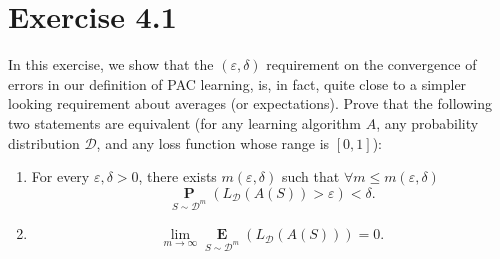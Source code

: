 \documentclass[10pt, a4paper, twoside]{amsart}
\renewcommand{\P}{\operatorname*{\ensuremath{\mathbf{P}}}} %
\newcommand{\Ev}{\operatorname*{\ensuremath{\mathbf{E}}}} %
\begin{document}
\section*{Exercise 4.1}
In this exercise, we show that the $(\varepsilon , \delta )$ requirement on the convergence of errors in our definition of PAC learning, is, in fact, quite close to a simpler looking requirement about averages (or expectations). Prove that the following two statements are equivalent (for any learning algorithm $A$, any probability distribution $\mathcal{D}$, and any loss function whose range is $[0,1]$):
\begin{enumerate}
 \item \label{it:convergence_probability} For every $\varepsilon , \delta > 0$, there exists $m(\varepsilon , \delta)$ such that $\forall m \leq m(\varepsilon , \delta)$
\begin{equation*}
\P_{S \sim \mathcal{D}^m}(L_{\mathcal{D}}(A(S))>\varepsilon)<\delta.
\end{equation*}
\item \label{it:convergence_expectation} 
\begin{equation*}
\lim_{m\to \infty}\Ev_{S\sim \mathcal{D}^{m}}(L_{\mathcal{D}}(A(S))) = 0.
\end{equation*}
\end{enumerate}
\end{document}
